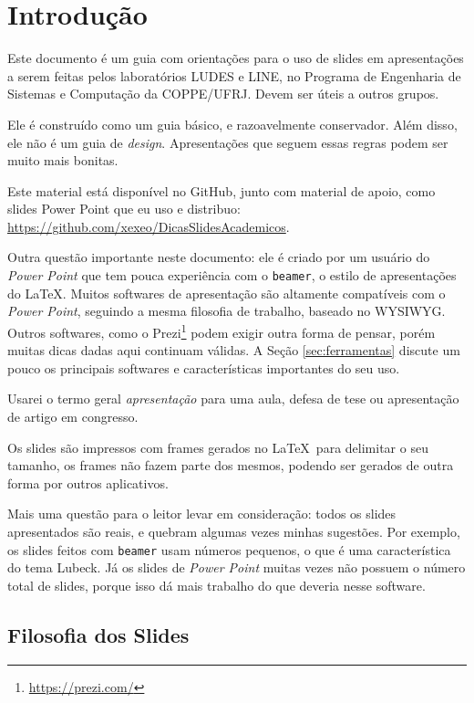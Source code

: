 \section{Introdução}

Este documento é um guia com orientações para o uso de slides em apresentações a serem feitas pelos laboratórios LUDES e LINE, no Programa de Engenharia de Sistemas e Computação da COPPE/UFRJ. Devem ser úteis a outros grupos.

Ele é construído como um guia básico, e razoavelmente conservador.
Além disso, ele não é um guia de \textit{design}.
Apresentações que seguem essas regras podem ser muito mais bonitas.

Este material está disponível no GitHub, junto com material de apoio, como slides Power Point que eu uso e distribuo: \url{https://github.com/xexeo/DicasSlidesAcademicos}.

Outra questão importante neste documento: ele é criado por um usuário do \textit{Power Point} que tem pouca experiência com o \texttt{beamer}, o estilo de apresentações do \LaTeX.
Muitos softwares de apresentação são altamente compatíveis com o \textit{Power Point}, seguindo a mesma filosofia de trabalho, baseado no WYSIWYG.
Outros softwares, como o Prezi\footnote{\url{https://prezi.com/}} podem exigir outra forma de pensar, porém muitas dicas dadas aqui continuam válidas. A Seção \ref{sec:ferramentas} discute um pouco os principais softwares e características importantes do seu uso.

Usarei o termo geral \textit{apresentação} para uma aula, defesa de tese ou apresentação de artigo em congresso.

Os slides são impressos com frames gerados no \LaTeX\ para delimitar o seu tamanho, os frames não fazem parte dos mesmos, podendo ser gerados de outra forma por outros aplicativos.

Mais uma questão para o leitor levar em consideração: todos os slides apresentados são reais, e quebram algumas vezes minhas sugestões.
Por exemplo, os slides feitos com \texttt{beamer} usam números pequenos, o que é uma característica do tema Lubeck.
Já os slides de \textit{Power Point} muitas vezes não possuem o número total de slides, porque isso dá mais trabalho do que deveria nesse software.

\subsection{Filosofia dos Slides}

